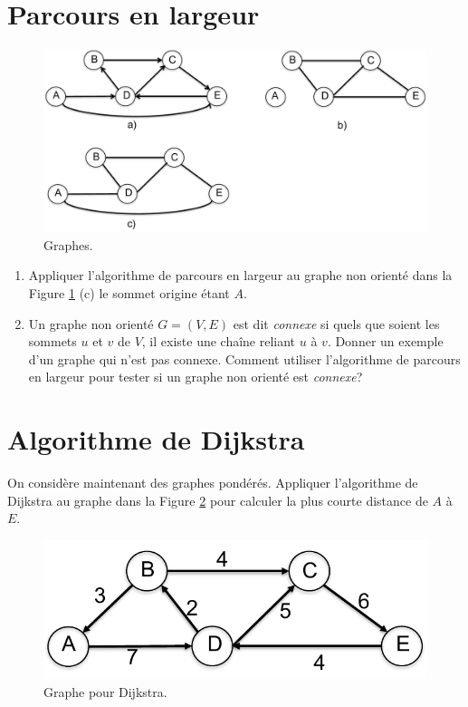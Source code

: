 \documentclass{article}[12pt]
\begin{document}
\section*{Parcours en largeur}
\begin{figure}[hbtp] 
  \centering
\includegraphics[scale =0.5] {graphes.pdf} \caption{Graphes.} \label{fig:graphes}
\end{figure}

\begin{enumerate}
\item Appliquer l’algorithme de parcours en largeur au graphe non orienté dans la Figure \ref{fig:graphes} (c) le sommet origine étant $A$.
\item Un graphe non orienté $G=(V,E)$ est dit \emph{connexe} si quels que soient les sommets $u$ et $v$ de $V$, il existe une chaîne reliant $u$ à $v$. Donner un exemple d'un graphe qui n'est pas connexe. Comment utiliser l’algorithme de parcours en largeur pour tester si un graphe non orienté est \emph{connexe}?
\end{enumerate}


\section*{Algorithme de Dijkstra}
On considère maintenant des graphes pondérés. Appliquer l'algorithme de Dijkstra au graphe dans la Figure \ref{fig:grapheDijkstra} pour calculer la plus courte distance de $A$ à $E$.

\begin{figure}[hbtp] 
  \centering
\includegraphics[scale =0.5] {graphe.pdf} \caption{Graphe pour Dijkstra.} \label{fig:grapheDijkstra}
\end{figure}
\end{document}
